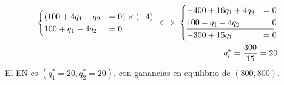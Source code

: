 \documentclass[12pt]{scrartcl} %
\begin{document}
\begin{Exercise}[name={Respuesta}]
\begin{enumerate}
          \begin{align*}
            \begin{cases}
              (100 + 4q_1 -q_2 & = 0)\times (-4) \\
              100 + q_1 - 4q_2 & = 0
            \end{cases}
            \iff  \begin{cases}
                    -400 + 16q_1 + 4q_2 & = 0 \\
                    100 -q_1 - 4q_2     & = 0 \\%
                    \multispan2{\hrulefill}   \\
                    -300 + 15q_1        & = 0
                  \end{cases} \\
            q_i^* = \frac{300}{15} = 20
          \end{align*}
          El EN es $ (q_1^* = 20, q_2^* = 20) $, con ganancias en equilibrio de $ (800, 800) $.
  \end{enumerate}

\end{Exercise}
\end{document}
